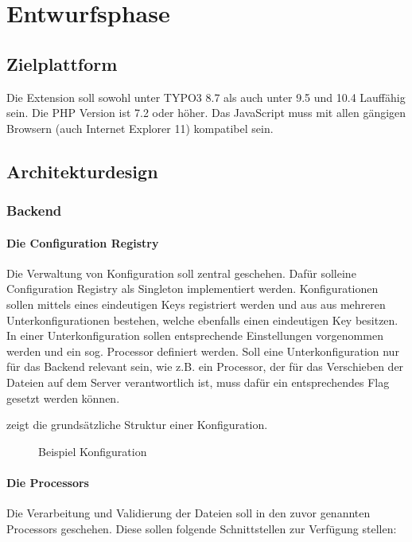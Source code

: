 \section{Entwurfsphase} 
\label{sec:Entwurfsphase}

\subsection{Zielplattform}
\label{sec:Zielplattform}

Die Extension soll sowohl unter TYPO3 8.7 als auch unter 9.5 und 10.4 Lauffähig sein. Die PHP Version ist 7.2 oder höher. Das JavaScript muss mit allen gängigen Browsern (auch Internet Explorer 11) kompatibel sein.


\subsection{Architekturdesign}
\label{sec:Architekturdesign}

\subsubsection{Backend}
\label{sec:Backend}

\paragraph{Die Configuration Registry} Die Verwaltung von Konfiguration soll zentral geschehen. Dafür solleine Configuration Registry als Singleton implementiert werden. Konfigurationen sollen mittels eines eindeutigen Keys registriert werden und aus  aus mehreren Unterkonfigurationen bestehen, welche ebenfalls einen eindeutigen Key besitzen. In einer Unterkonfiguration sollen entsprechende Einstellungen vorgenommen werden und ein sog. Processor definiert werden. Soll eine Unterkonfiguration nur für das Backend relevant sein, wie z.B. ein Processor, der für das Verschieben der Dateien auf dem Server verantwortlich ist, muss dafür ein entsprechendes Flag gesetzt werden können. 

 zeigt die grundsätzliche Struktur einer Konfiguration.
\begin{figure}[htb]
\centering
{}
\caption{Beispiel Konfiguration}
\label{fig:beispiel_konfiguration}
\end{figure}

\paragraph{Die Processors} Die Verarbeitung und Validierung der Dateien soll in den zuvor genannten Processors geschehen. Diese sollen folgende Schnittstellen zur Verfügung stellen:

